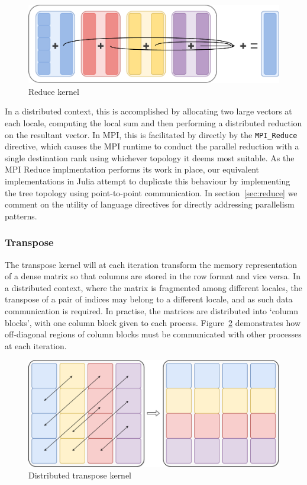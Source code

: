 \begin{figure}[htb]
  \includegraphics[width=\linewidth]{figs/Reduce.pdf}
  \caption{Reduce kernel}
  \label{fig:reduce-diagram}
\end{figure}

In a distributed context, this is accomplished by allocating two large
vectors at each locale, computing the local sum and then performing a
distributed reduction on the resultant vector. In MPI, this is
facilitated by directly by the \texttt{MPI\_Reduce} directive, which
causes the MPI runtime to conduct the parallel reduction with a single
destination rank using whichever topology it deems most suitable. As the
MPI Reduce implmentation performs its work in place, our equivalent
implementations in Julia attempt to duplicate this behaviour by
implementing the tree topology using point-to-point communication. In
section~\ref{sec:reduce} we comment on the utility of language
directives for directly addressing parallelism patterns.

\subsubsection{Transpose}
\label{sec:transpose-kernel}

The transpose kernel will at each iteration transform the memory
representation of a dense matrix so that columns are stored in the row
format and vice versa. In a distributed context, where the matrix is
fragmented among different locales, the transpose of a pair of indices
may belong to a different locale, and as such data communication is
required. In practise, the matrices are distributed into `column
blocks', with one column block given to each process. Figure~\ref{fig:transpose-diagram} demonstrates how off-diagonal regions of
column blocks must be communicated with other processes at each
iteration.

\begin{figure}[htb]
  \includegraphics[width=\linewidth]{figs/Transpose.pdf}
  \caption{Distributed transpose kernel}
  \label{fig:transpose-diagram}
\end{figure}

